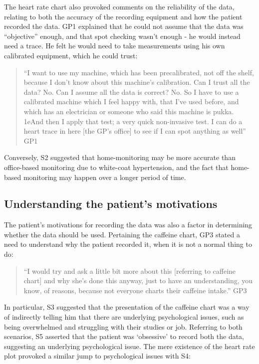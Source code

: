 \documentclass{sigchi}
\begin{document}
The heart rate chart also provoked comments on the reliability of the data, relating to both the accuracy of the recording equipment and how the patient recorded the data. GP1 explained that he could not assume that the data was ``objective'' enough, and that spot checking wasn't enough - he would instead need a trace. He felt he would need to take measurements using his own calibrated equipment, which he could trust:

\begin{quote}
    ``I want to use my machine, which has been precalibrated, not off the shelf, because I don't know about this machine's calibration. Can I trust all the data? No. Can I assume all the data is correct? No. So I have to use a calibrated machine which I feel happy with, that I've used before, and which has an electrician or someone who said this machine is pukka. 1eAnd then I apply that test; a very quick non-invasive test. I can do a heart trace in here [the GP's office] to see if I can spot anything as well'' GP1
\end{quote}

Conversely, S2 suggested that home-monitoring may be more accurate than office-based monitoring due to white-coat hypertension, and the fact that home-based monitoring may happen over a longer period of time.


\subsection{Understanding the patient's motivations}

The patient's motivations for recording the data was also a factor in determining whether the data should be used. Pertaining the caffeine chart, GP3 stated a need to understand why the patient recorded it, when it is not a normal thing to do:

\begin{quote}
    ``I would try and ask a little bit more about this [referring to caffeine chart] and why she's done this anyway, just to have an understanding, you know, of reasons, because not everyone charts their caffeine intake.'' GP3
\end{quote}

In particular, S3 suggested that the presentation of the caffeine chart was a way of indirectly telling him that there are underlying psychological issues, such as being overwhelmed and struggling with their studies or job. Referring to both scenarios, S5 asserted that the patient was `obsessive' to record both the data, suggesting an underlying psychological issue. The mere existence of the heart rate plot provoked a similar jump to psychological issues with S4:
\end{document}
